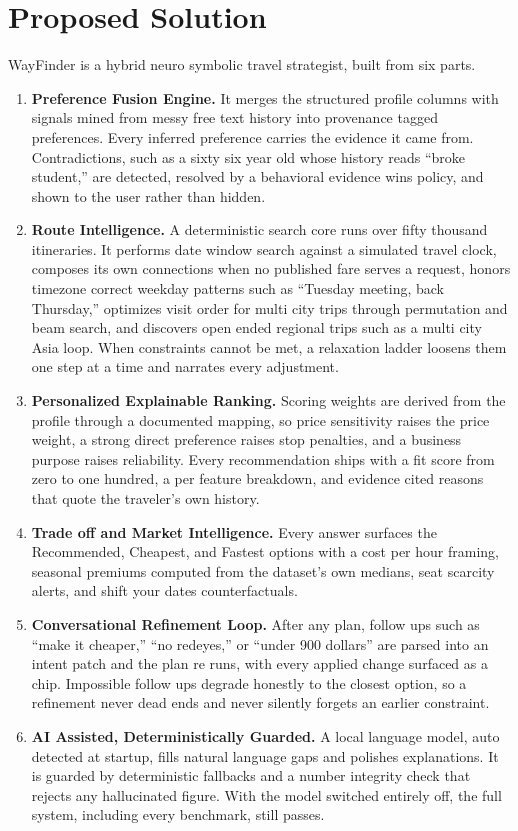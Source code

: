 \documentclass[11pt,a4paper]{article}
\begin{document}
\section{Proposed Solution}
WayFinder is a hybrid neuro symbolic travel strategist, built from six parts.
\begin{enumerate}
  \item \textbf{Preference Fusion Engine.} It merges the structured profile columns with signals
    mined from messy free text history into provenance tagged preferences. Every inferred
    preference carries the evidence it came from. Contradictions, such as a sixty six year old
    whose history reads ``broke student,'' are detected, resolved by a behavioral evidence wins
    policy, and shown to the user rather than hidden.
  \item \textbf{Route Intelligence.} A deterministic search core runs over fifty thousand
    itineraries. It performs date window search against a simulated travel clock, composes its own
    connections when no published fare serves a request, honors timezone correct weekday patterns
    such as ``Tuesday meeting, back Thursday,'' optimizes visit order for multi city trips through
    permutation and beam search, and discovers open ended regional trips such as a multi city Asia
    loop. When constraints cannot be met, a relaxation ladder loosens them one step at a time and
    narrates every adjustment.
  \item \textbf{Personalized Explainable Ranking.} Scoring weights are derived from the profile
    through a documented mapping, so price sensitivity raises the price weight, a strong direct
    preference raises stop penalties, and a business purpose raises reliability. Every
    recommendation ships with a fit score from zero to one hundred, a per feature breakdown, and
    evidence cited reasons that quote the traveler's own history.
  \item \textbf{Trade off and Market Intelligence.} Every answer surfaces the Recommended,
    Cheapest, and Fastest options with a cost per hour framing, seasonal premiums computed from
    the dataset's own medians, seat scarcity alerts, and shift your dates counterfactuals.
  \item \textbf{Conversational Refinement Loop.} After any plan, follow ups such as ``make it
    cheaper,'' ``no redeyes,'' or ``under 900 dollars'' are parsed into an intent patch and the
    plan re runs, with every applied change surfaced as a chip. Impossible follow ups degrade
    honestly to the closest option, so a refinement never dead ends and never silently forgets an
    earlier constraint.
  \item \textbf{AI Assisted, Deterministically Guarded.} A local language model, auto detected at
    startup, fills natural language gaps and polishes explanations. It is guarded by deterministic
    fallbacks and a number integrity check that rejects any hallucinated figure. With the model
    switched entirely off, the full system, including every benchmark, still passes.
\end{enumerate}
\end{document}
